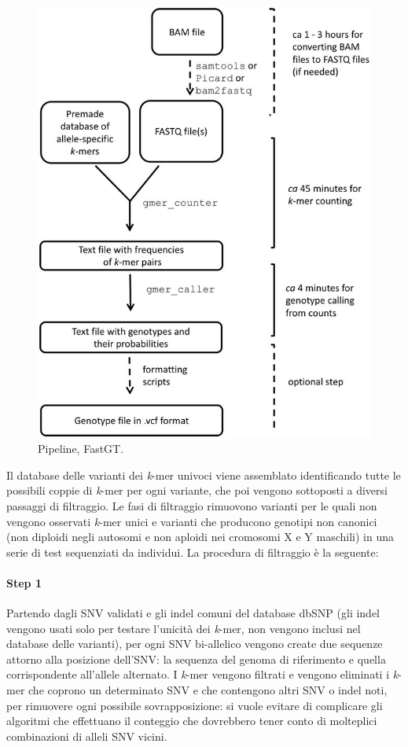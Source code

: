 \documentclass[../main.tex]{subfiles}
\begin{document}
 \begin{figure}[h!]
	\centering
  	\captionsetup{justification=centering}
  	\includegraphics[scale=.25]{images/fastgt-pipeline.jpg}
  	\caption{Pipeline, FastGT.}
  	\label{fig:fastgt}
\end{figure}

\noindent
Il database delle varianti dei \textit{k}-mer univoci viene assemblato identificando tutte le possibili coppie di \textit{k}-mer per ogni variante, che poi vengono sottoposti a diversi passaggi di filtraggio. Le fasi di filtraggio rimuovono varianti per le quali non vengono osservati \textit{k}-mer unici e varianti che producono genotipi non canonici (non diploidi negli autosomi e non aploidi nei cromosomi X e Y maschili) in una serie di test sequenziati da individui. La procedura di filtraggio è la seguente:

\paragraph{Step 1} Partendo dagli SNV validati e gli indel comuni del database dbSNP (gli indel vengono usati solo per testare l'unicità dei \textit{k}-mer, non vengono inclusi nel database delle varianti), per ogni SNV bi-allelico vengono create due sequenze attorno alla posizione dell'SNV: la sequenza del genoma di riferimento e quella corrispondente all'allele alternato. I \textit{k}-mer vengono filtrati e vengono eliminati i \textit{k}-mer che coprono un determinato SNV e che contengono altri SNV o indel noti, per rimuovere ogni possibile sovrapposizione: si vuole evitare di complicare gli algoritmi che effettuano il conteggio che dovrebbero tener conto di molteplici combinazioni di alleli SNV vicini. 
\end{document}

